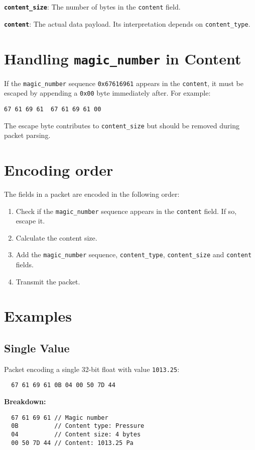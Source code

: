 \documentclass[a4paper]{article}
\begin{document}
\textbf{\texttt{content\_size}}: The number of bytes in the \texttt{content} field.

\textbf{\texttt{content}}: The actual data payload. Its interpretation depends on \texttt{content\_type}.

\section{Handling \texttt{magic\_number} in Content}
If the \texttt{magic\_number} sequence \texttt{0x67616961} appears in the \texttt{content}, it must be escaped by appending a \texttt{0x00} byte immediately after. For example:

\texttt{67 61 69 61 }\textrightarrow\texttt{ 67 61 69 61 00}

The escape byte contributes to \texttt{content\_size} but should be removed during packet parsing.

\section{Encoding order}
The fields in a packet are encoded in the following order:
\begin{enumerate}
  \item Check if the \texttt{magic\_number} sequence appears in the \texttt{content} field. If so, escape it.
  \item Calculate the content size.
  \item Add the \texttt{magic\_number} sequence, \texttt{content\_type}, \texttt{content\_size} and \texttt{content} fields.
  \item Transmit the packet.
\end{enumerate}

\section{Examples}
\subsection{Single Value}
Packet encoding a single 32-bit float with value \texttt{1013.25}:
\begin{verbatim}
  67 61 69 61 0B 04 00 50 7D 44
\end{verbatim}
\textbf{Breakdown:}
\begin{verbatim}
  67 61 69 61 // Magic number
  0B          // Content type: Pressure
  04          // Content size: 4 bytes
  00 50 7D 44 // Content: 1013.25 Pa
\end{verbatim}
\end{document}
